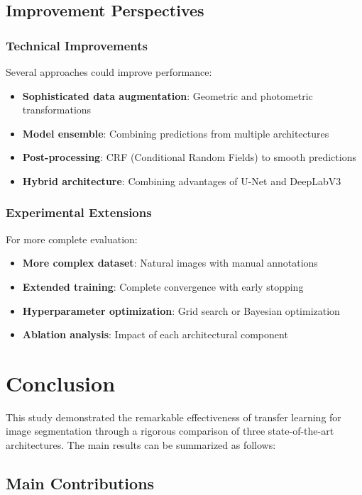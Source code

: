 \documentclass[12pt,a4paper]{article}
\begin{document}
\subsection{Improvement Perspectives}

\subsubsection{Technical Improvements}

Several approaches could improve performance:
\begin{itemize}
    \item \textbf{Sophisticated data augmentation}: Geometric and photometric transformations
    \item \textbf{Model ensemble}: Combining predictions from multiple architectures
    \item \textbf{Post-processing}: CRF (Conditional Random Fields) to smooth predictions
    \item \textbf{Hybrid architecture}: Combining advantages of U-Net and DeepLabV3
\end{itemize}

\subsubsection{Experimental Extensions}

For more complete evaluation:
\begin{itemize}
    \item \textbf{More complex dataset}: Natural images with manual annotations
    \item \textbf{Extended training}: Complete convergence with early stopping
    \item \textbf{Hyperparameter optimization}: Grid search or Bayesian optimization
    \item \textbf{Ablation analysis}: Impact of each architectural component
\end{itemize}

\section{Conclusion}

This study demonstrated the remarkable effectiveness of transfer learning for image segmentation through a rigorous comparison of three state-of-the-art architectures. The main results can be summarized as follows:

\subsection{Main Contributions}
\end{document}
